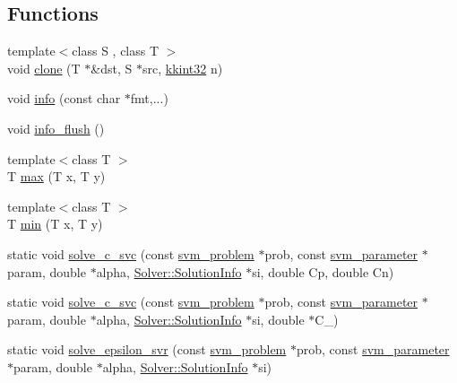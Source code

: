 \subsection*{Functions}
\begin{DoxyCompactItemize}
\item 
{\footnotesize template$<$class S , class T $>$ }\\void \hyperlink{namespace_s_v_m233_a042890ae5011103ccc6062a677cff472}{clone} (T $\ast$\&dst, S $\ast$src, \hyperlink{namespace_k_k_b_a8fa4952cc84fda1de4bec1fbdd8d5b1b}{kkint32} n)
\item 
void \hyperlink{namespace_s_v_m233_a0ebae296798b259c5fe4850260bc3d60}{info} (const char $\ast$fmt,...)
\item 
void \hyperlink{namespace_s_v_m233_aa9479af6b244e998b5b35f52720c309e}{info\+\_\+flush} ()
\item 
{\footnotesize template$<$class T $>$ }\\T \hyperlink{namespace_s_v_m233_af89e72ffe29dd42949c494bc4ec751e6}{max} (T x, T y)
\item 
{\footnotesize template$<$class T $>$ }\\T \hyperlink{namespace_s_v_m233_a1ffcc19cad97bf20039eaa77c0040425}{min} (T x, T y)
\item 
static void \hyperlink{namespace_s_v_m233_a3d48ff0cfde1955d7d4c98ff55312c30}{solve\+\_\+c\+\_\+svc} (const \hyperlink{struct_s_v_m233_1_1svm__problem}{svm\+\_\+problem} $\ast$prob, const \hyperlink{struct_s_v_m233_1_1svm__parameter}{svm\+\_\+parameter} $\ast$param, double $\ast$alpha, \hyperlink{struct_s_v_m233_1_1_solver_1_1_solution_info}{Solver\+::\+Solution\+Info} $\ast$si, double Cp, double Cn)
\item 
static void \hyperlink{namespace_s_v_m233_a14d8ba8d3c906b7ca528c215c94cb399}{solve\+\_\+c\+\_\+svc} (const \hyperlink{struct_s_v_m233_1_1svm__problem}{svm\+\_\+problem} $\ast$prob, const \hyperlink{struct_s_v_m233_1_1svm__parameter}{svm\+\_\+parameter} $\ast$param, double $\ast$alpha, \hyperlink{struct_s_v_m233_1_1_solver_1_1_solution_info}{Solver\+::\+Solution\+Info} $\ast$si, double $\ast$C\+\_\+)
\item 
static void \hyperlink{namespace_s_v_m233_af3672588d870cdeff1459d286d6ba294}{solve\+\_\+epsilon\+\_\+svr} (const \hyperlink{struct_s_v_m233_1_1svm__problem}{svm\+\_\+problem} $\ast$prob, const \hyperlink{struct_s_v_m233_1_1svm__parameter}{svm\+\_\+parameter} $\ast$param, double $\ast$alpha, \hyperlink{struct_s_v_m233_1_1_solver_1_1_solution_info}{Solver\+::\+Solution\+Info} $\ast$si)

\end{DoxyCompactItemize}
